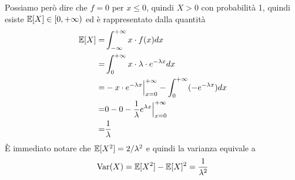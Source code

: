 Possiamo però dire che $f = 0$ per $x \leq 0$, quindi $X > 0$ con probabilità 1, quindi esiste
$\mathbb{E}[X] \in [0, +\infty)$ ed è rappresentato dalla quantità
\begin{align*}
	\mathbb{E}[X] = & \int_{-\infty}^{+\infty} x \cdot f(x) dx                      \\
	=       & \int_0^{+\infty} x \cdot \lambda \cdot e^{-\lambda x} dx      \\
	=       & -x \cdot e^{-\lambda x} \Big|_{x=0}^{+\infty} -
	\int_{0}^{+\infty} (-e^{-\lambda x}) dx                                 \\
	=       & 0 - 0 - \frac{1}{\lambda} e^{\lambda x} \Big|_{x=0}^{+\infty} \\
	=       & \frac{1}{\lambda}
\end{align*}
\`E immediato notare che $\mathbb{E}[X^2] = 2 / \lambda^2$ e quindi la varianza equivale a
\[ \operatorname{Var}(X) = \mathbb{E}[X^2] - \mathbb{E}[X]^2 = \frac{1}{\lambda^2} \]

